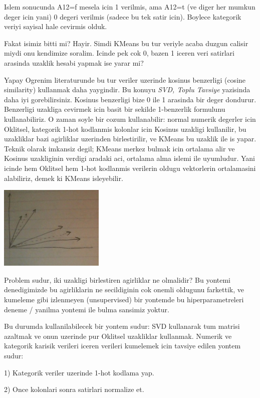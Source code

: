 \documentclass[12pt,fleqn]{article}\usepackage{../common}
\begin{document}
Islem sonucunda A12=f mesela icin 1 verilmis, ama A12=t (ve diger her
mumkun deger icin yani) 0 degeri verilmis (sadece bu tek satir
icin). Boylece kategorik veriyi sayisal hale cevirmis olduk.

Fakat isimiz bitti mi? Hayir. Simdi KMeans bu tur veriyle acaba duzgun
calisir miydi onu kendimize soralim. Icinde pek cok 0, bazen 1 iceren 
veri satirlari arasinda uzaklik hesabi yapmak ise yarar mi?

Yapay Ogrenim literaturunde bu tur veriler uzerinde kosinus benzerligi
(cosine similarity) kullanmak daha yaygindir. Bu konuyu {\em SVD, Toplu
  Tavsiye} yazisinda daha iyi gorebilirsiniz. Kosinus benzerligi bize 0 ile
1 arasinda bir deger dondurur. Benzerligi uzakliga cevirmek icin basit bir
sekilde 1-benzerlik formulunu kullanabiliriz. O zaman soyle bir cozum
kullanabilir: normal numerik degerler icin Oklitsel, kategorik 1-hot
kodlanmis kolonlar icin Kosinus uzakligi kullanilir, bu uzakliklar bazi
agirliklar uzerinden birlestirilir, ve KMeans bu uzaklik ile is
yapar. Teknik olarak imkansiz degil; KMeans merkez bulmak icin ortalama
alir ve Kosinus uzakliginin verdigi aradaki aci, ortalama alma islemi ile
uyumludur. Yani icinde hem Oklitsel hem 1-hot kodlanmis verilerin oldugu
vektorlerin ortalamasini alabiliriz, demek ki KMeans isleyebilir.

\includegraphics[height=4cm]{kmeans_5.jpg}

Problem sudur, iki uzakligi birlestiren agirliklar ne olmalidir?  Bu
yontemi denedigimizde bu agirliklarin ne secildiginin cok onemli oldugunu
farkettik, ve kumeleme gibi izlenmeyen (unsupervised) bir yontemde bu
hiperparametreleri deneme / yanilma yontemi ile bulma sansimiz yoktur.

Bu durumda kullanilabilecek bir yontem sudur: SVD kullanarak tum matrisi
azaltmak ve onun uzerinde pur Oklitsel uzakliklar kullanmak. Numerik ve
kategorik karisik verileri iceren verileri kumelemek icin tavsiye edilen
yontem sudur:

1) Kategorik veriler uzerinde 1-hot kodlama yap. 

2) Once kolonlari sonra satirlari normalize et.
\end{document}
